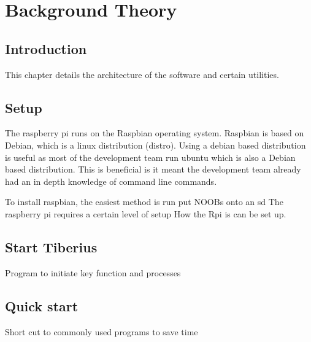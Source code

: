 \section{Background Theory}


\pagestyle{cameron}

\subsection{Introduction}
This chapter details the architecture of the software and certain utilities.

\subsection{Setup}
The raspberry pi runs on the Raspbian operating system. Raspbian is based on Debian, which is a linux distribution (distro). Using a debian based distribution is useful as most of the development team run ubuntu which is also a Debian based distribution. This is beneficial is it meant the development team already had an in depth knowledge of command line commands.

To install raspbian, the easiest method is run put NOOBs onto an sd 
The raspberry pi requires a certain level of setup
How the Rpi is can be set up.

\subsection{Start Tiberius}
Program to initiate key function and processes

\subsection{Quick start}
Short cut to commonly used programs to save time













